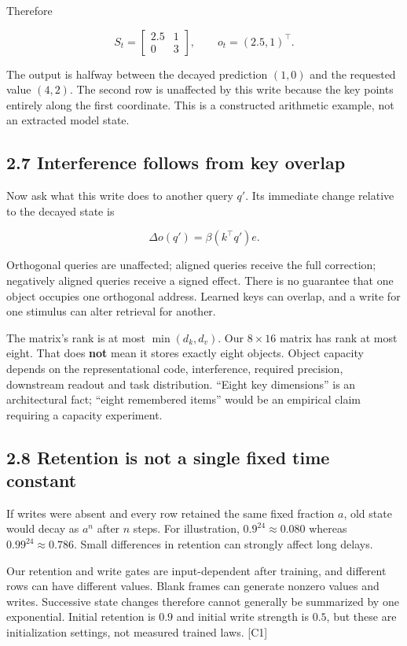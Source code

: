 \documentclass[
  11pt,
]{article}
\let\oldsubsection\subsection
\renewcommand{\subsection}{\Needspace{6\baselineskip}\oldsubsection}
\begin{document}
Therefore

\[S_t=\begin{bmatrix}2.5&1\\0&3\end{bmatrix},\qquad o_t=(2.5,1)^\top.\]

The output is halfway between the decayed prediction \((1,0)\) and the
requested value \((4,2)\). The second row is unaffected by this write
because the key points entirely along the first coordinate. This is a
constructed arithmetic example, not an extracted model state.

\subsection{2.7 Interference follows from key
overlap}\label{interference-follows-from-key-overlap}

Now ask what this write does to another query \(q'\). Its immediate
change relative to the decayed state is

\[\Delta o(q')=\beta(k^\top q')e.\]

Orthogonal queries are unaffected; aligned queries receive the full
correction; negatively aligned queries receive a signed effect. There is
no guarantee that one object occupies one orthogonal address. Learned
keys can overlap, and a write for one stimulus can alter retrieval for
another.

The matrix's rank is at most \(\min(d_k,d_v)\). Our \(8\times16\) matrix
has rank at most eight. That does \textbf{not} mean it stores exactly
eight objects. Object capacity depends on the representational code,
interference, required precision, downstream readout and task
distribution. ``Eight key dimensions'' is an architectural fact; ``eight
remembered items'' would be an empirical claim requiring a capacity
experiment.

\subsection{2.8 Retention is not a single fixed time
constant}\label{retention-is-not-a-single-fixed-time-constant}

If writes were absent and every row retained the same fixed fraction
\(a\), old state would decay as \(a^n\) after \(n\) steps. For
illustration, \(0.9^{24}\approx0.080\) whereas
\(0.99^{24}\approx0.786\). Small differences in retention can strongly
affect long delays.

Our retention and write gates are input-dependent after training, and
different rows can have different values. Blank frames can generate
nonzero values and writes. Successive state changes therefore cannot
generally be summarized by one exponential. Initial retention is \(0.9\)
and initial write strength is \(0.5\), but these are initialization
settings, not measured trained laws. {[}C1{]}
\end{document}
